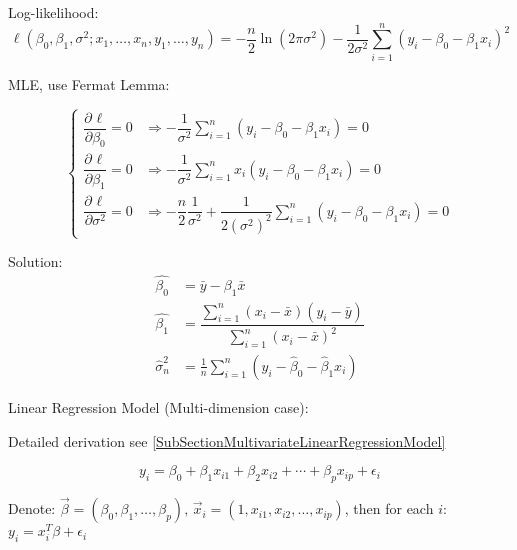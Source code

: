 \begin{enumerate}
    Log-likelihood:
    \begin{equation}
        \ell(\beta _0,\beta _1,\sigma ^2;x_1,\ldots,x_n,y_1,\ldots,y_n)=-\dfrac{n}{2} \ln(2\pi\sigma ^2)-\dfrac{1}{2\sigma ^2}\sum_{i=1}^n(y_i-\beta _0-\beta _1x_i)^2
    \end{equation}

    MLE, use Fermat Lemma:

\begin{equation}
    \begin{cases}
        \dfrac{\partial^{} \ell}{\partial \beta _0^{}}=0&\Rightarrow -\dfrac{1}{\sigma ^2}{\displaystyle\sum_{i=1}^n(y_i-\beta _0-\beta _1x_i)}=0\\
        \dfrac{\partial^{} \ell}{\partial \beta _1^{}}=0&\Rightarrow -\dfrac{1}{\sigma ^2}{\displaystyle\sum_{i=1}^nx_i(y_i-\beta _0-\beta _1x_i)}=0\\
        \dfrac{\partial^{} \ell}{\partial \sigma^2}=0&\Rightarrow -\dfrac{n}{2}\dfrac{1}{\sigma ^2}+\dfrac{1}{2(\sigma ^2)^2} {\displaystyle\sum_{i=1}^n(y_i-\beta _0-\beta _1x_i)}=0
    \end{cases} 
\end{equation}

    Solution:
    \begin{align}
        \hat{\beta_0}&=\bar{y}-\beta_1\bar{x}\\
        \hat{\beta_1}&=\dfrac{\sum_{i=1}^n(x_i-\bar{x})(y_i-\bar{y})}{\sum_{i=1}^n(x_i-\bar{x})^2}\\
        \hat{\sigma}^2_n&=\frac{1}{n}\sum_{i=1}^n(y_i-\hat{\beta}_0-\hat{\beta}_1x_i)
    \end{align}
    
    
    \end{enumerate}

\begin{point}
    Linear Regression Model (Multi-dimension case):
\end{point}

    Detailed derivation see \autoref{SubSectionMultivariateLinearRegressionModel}
    
\begin{equation}
    y_i=\beta_0+\beta_1x_{i1}+\beta_2x_{i2}+\cdots+\beta_px_{ip}+\epsilon_i    
\end{equation}

    Denote: $\vec{\beta}=(\beta_0,\beta_1,\ldots,\beta_p),\, \vec{x}_i=(1,x_{i1},x_{i2},\ldots,x_{ip})$, then for each $i$: $y_i=x_i^T\beta+\epsilon_i$

